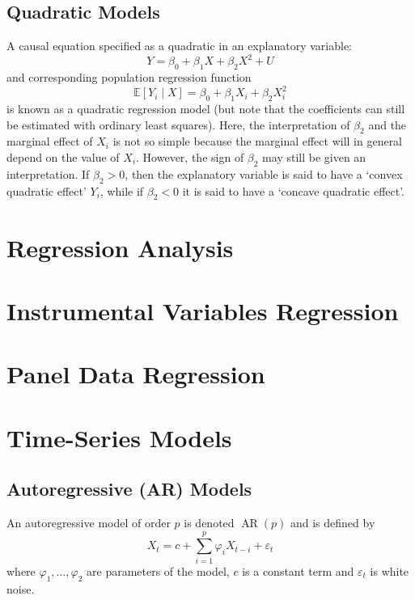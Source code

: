 \documentclass[11pt]{report} %
\begin{document}
\subsection{Quadratic Models}

A causal equation specified as a quadratic in an explanatory variable:
\begin{equation}
Y = \beta_{0} + \beta_{1}X + \beta_{2}X^{2} + U
\end{equation}
and corresponding population regression function
\begin{equation}
\mathbb{E}\left[Y_{i}\middle|X\right] =  \beta_{0} + \beta_{1}X_{i} + \beta_{2}X_{i}^{2}
\end{equation}
is known as a quadratic regression model (but note that the coefficients can still be estimated with ordinary least squares). Here, the interpretation of $\beta_{2}$ and the marginal effect of $X_{i}$ is not so simple because the marginal effect will in general depend on the value of $X_{i}$. However, the sign of $\beta_{2}$ may still be given an interpretation. If $\beta_{2} > 0$, then the explanatory variable is said to have a `convex quadratic effect' $Y_{i}$, while if $\beta_{2} < 0$ it is said to have a `concave quadratic effect'.

\section{Regression Analysis}

\section{Instrumental Variables Regression}

\section{Panel Data Regression}

\section{Time-Series Models}

\subsection{Autoregressive (AR) Models}
An autoregressive model of order $p$ is denoted $\operatorname{AR}\left(p\right)$ and is defined by
\begin{equation}
X_{t} = c + \sum_{i = 1}^{p}\varphi_{i}X_{t - i} + \varepsilon_{t}
\end{equation}
where $\varphi_{1}, \dots, \varphi_{2}$ are parameters of the model, $c$ is a constant term and $\varepsilon_{t}$ is white noise.
\end{document}
